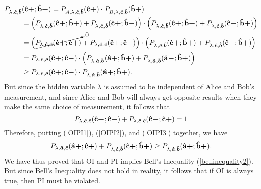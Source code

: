 \begin{equation}\label{OIPI2}
\begin{split}
 P_{\lambda,\bm{\hat{c}},\bm{\hat{b}}}&(\vb{\hat{{c}}}\bm{+};\vb{\hat{{b}}}\bm{+})=P_{A,\lambda,\bm{\hat{c}},\bm{\hat{b}}}(\vb{\hat{{c}}}\bm{+})\cdot P_{B,\lambda,\bm{\hat{c}},\bm{\hat{b}}}(\vb{\hat{{b}}}\bm{+})\\
 &= \Big( P_{\lambda,\bm{\hat{c}},\bm{\hat{b}}}(\vb{\hat{{c}}}\bm{+};\vb{\hat{{b}}}\bm{+})+ P_{\lambda,\bm{\hat{c}},\bm{\hat{b}}}(\vb{\hat{{c}}}\bm{+};\vb{\hat{{b}}}\bm{-})\Big)\cdot\Big( P_{\lambda,\bm{\hat{c}},\bm{\hat{b}}}(\vb{\hat{{c}}}\bm{+};\vb{\hat{{b}}}\bm{+})+ P_{\lambda,\bm{\hat{c}},\bm{\hat{b}}}(\vb{\hat{{c}}}\bm{-};\vb{\hat{{b}}}\bm{+})\Big)\\
 &= \Big(  \cancelto{0}{P_{\lambda,\bm{\hat{c}},\bm{\hat{c}}}(\vb{\hat{{c}}}\bm{+};\vb{\hat{{c}}}\bm{+})}+ P_{\lambda,\bm{\hat{c}},\bm{\hat{c}}}(\vb{\hat{{c}}}\bm{+};\vb{\hat{{c}}}\bm{-})\Big)\cdot\Big(P_{\lambda,\bm{\hat{c}},\bm{\hat{b}}}(\vb{\hat{{c}}}\bm{+};\vb{\hat{{b}}}\bm{+})+ P_{\lambda,\bm{\hat{c}},\bm{\hat{b}}}(\vb{\hat{{c}}}\bm{-};\vb{\hat{{b}}}\bm{+})\Big)\\
 &=P_{\lambda,\bm{\hat{c}},\bm{\hat{c}}}(\vb{\hat{{c}}}\bm{+};\vb{\hat{{c}}}\bm{-})\cdot\Big( P_{\lambda,\bm{\hat{a}},\bm{\hat{b}}}(\vb{\hat{{a}}}\bm{+};\vb{\hat{{b}}}\bm{+})+ P_{\lambda,\bm{\hat{a}},\bm{\hat{b}}}(\vb{\hat{{a}}}\bm{-};\vb{\hat{{b}}}\bm{+})\Big)\\
 &\geq P_{\lambda,\bm{\hat{c}},\bm{\hat{c}}}(\vb{\hat{{c}}}\bm{+};\vb{\hat{{c}}}\bm{-})\cdot P_{\lambda,\bm{\hat{a}},\bm{\hat{b}}}(\vb{\hat{{a}}}\bm{+};\vb{\hat{{b}}}\bm{+}) .
\end{split}
\end{equation}
But since the hidden variable $\lambda$ is assumed to be independent of Alice and Bob's measurement, and since Alice and Bob will always get opposite results when they make the same choice of measurement, it follows that 
\begin{equation}\label{OIPI3}
P_{\lambda,\bm{\hat{c}},\bm{\hat{c}}}(\vb{\hat{{c}}}\bm{+};\vb{\hat{{c}}}\bm{-})+P_{\lambda,\bm{\hat{c}},\bm{\hat{c}}}(\vb{\hat{{c}}}\bm{-};\vb{\hat{{c}}}\bm{+})=1
\end{equation}
Therefore, putting (\ref{OIPI1}), (\ref{OIPI2}), and (\ref{OIPI3}) together, we have
\begin{equation}
P_{\lambda,\bm{\hat{a}},\bm{\hat{c}}}(\vb{\hat{{a}}}\bm{+};\vb{\hat{{c}}}\bm{+})+P_{\lambda,\bm{\hat{c}},\bm{\hat{b}}}(\vb{\hat{{c}}}\bm{+};\vb{\hat{{b}}}\bm{+})\geq P_{\lambda,\bm{\hat{a}},\bm{\hat{b}}}(\vb{\hat{{a}}}\bm{+};\vb{\hat{{b}}}\bm{+}).
\end{equation}
We have thus proved that OI and PI implies Bell's Inequality (\ref{bellinequality2}). But since Bell's Inequality does not hold in reality, it follows that if OI is always true, then PI must be violated.


